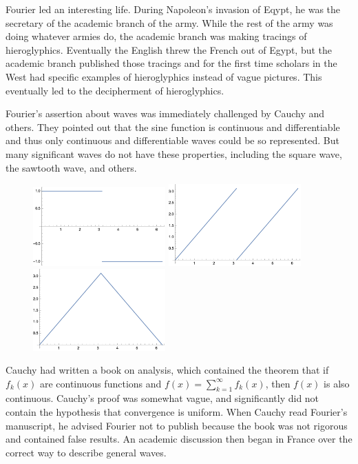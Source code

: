 \documentclass[11pt, oneside]{article}   	%
\begin{document}
Fourier led an interesting life. During Napoleon's invasion of Eqypt, he was the secretary of the academic branch of the army. While the rest of the army was doing whatever armies do, the academic branch was making tracings of hieroglyphics. Eventually the English threw the French out of Egypt, but the academic branch published those tracings and for the first time scholars in the West had specific examples of hieroglyphics instead of vague pictures. This eventually led to the decipherment of hieroglyphics.

Fourier's assertion about waves was immediately challenged by Cauchy and others. They pointed out that the sine function is continuous and differentiable and thus only continuous and differentiable waves could be so represented. But many significant waves do not have these properties, including the square wave, the sawtooth wave, and others.  

\begin{figure}[htbp] %
   \centering
   \includegraphics[width=2in]{Graphics/square} \hspace{.5in}   \includegraphics[width=2in]{Graphics/sawtooth}
    \hspace{.5in}   \includegraphics[width=2in]{Graphics/wedge}
\end{figure}

Cauchy had written a book on analysis, which contained the theorem that if $f_k(x)$ are continuous functions and $f(x) = \sum_{k = 1}^\infty f_k(x)$, then $f(x)$ is also continuous. Cauchy's proof was somewhat vague, and significantly did not contain the hypothesis that convergence is uniform. When Cauchy read Fourier's manuscript, he advised Fourier not to publish because the book was not rigorous and contained  false results. An academic discussion then began in France over the correct way to describe general waves.
\end{document}
